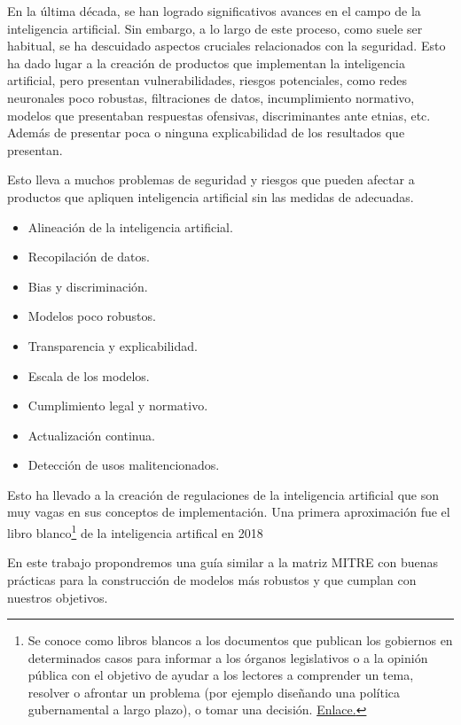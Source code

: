 En la última década, se han logrado significativos avances en el campo de la inteligencia artificial. Sin embargo, a lo largo de este proceso, como suele ser habitual, se ha descuidado  aspectos cruciales relacionados con la seguridad. Esto ha dado lugar a la creación de productos que implementan la inteligencia artificial, pero presentan vulnerabilidades, riesgos potenciales, como redes neuronales poco robustas, filtraciones de datos, incumplimiento normativo, modelos que presentaban respuestas ofensivas, discriminantes ante etnias, etc. Además de presentar poca o ninguna explicabilidad de los resultados que presentan.

Esto lleva a muchos problemas de seguridad y riesgos que pueden afectar a productos que apliquen inteligencia artificial sin las medidas de adecuadas.

\begin{itemize}
    \item Alineación de la inteligencia artificial.
    \item Recopilación de datos.
    \item Bias y discriminación.
    \item Modelos poco robustos.
    \item Transparencia y explicabilidad.
    \item Escala de los modelos.
    \item Cumplimiento legal y normativo.
    \item Actualización continua.
    \item Detección de usos malitencionados.
\end{itemize}

Esto ha llevado a la creación de regulaciones de la inteligencia artificial que son muy vagas en sus conceptos de implementación. Una primera aproximación fue el libro blanco\footnote{Se conoce como libros blancos a los documentos que publican los gobiernos en determinados casos para informar a los órganos legislativos o a la opinión pública con el objetivo de ayudar a los lectores a comprender un tema, resolver o afrontar un problema (por ejemplo diseñando una política gubernamental a largo plazo), o tomar una decisión. \href{https://es.wikipedia.org/wiki/Libro_blanco}{Enlace.}} de la inteligencia artifical en 2018 \cite{whitebook2020AI}

En este trabajo propondremos una guía similar a la matriz \gls{MITRE} con buenas prácticas para la construcción de modelos más robustos y que cumplan con nuestros objetivos.


